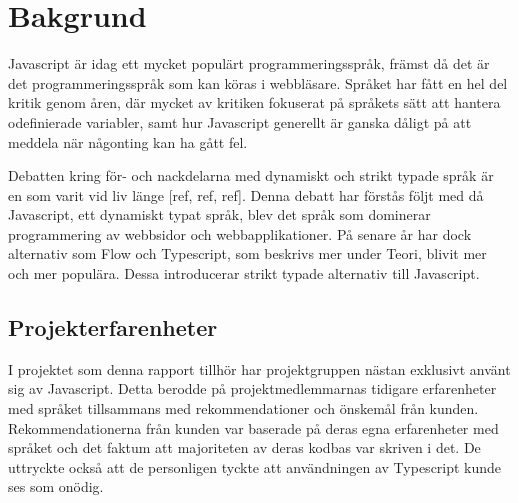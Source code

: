 \section{Bakgrund}
\label{sec:alexander-background}

Javascript är idag ett mycket populärt programmeringsspråk, främst då det är det programmeringsspråk som kan köras i webbläsare. Språket har fått en hel del kritik genom åren, där mycket av kritiken fokuserat på språkets sätt att hantera odefinierade variabler, samt hur Javascript generellt är ganska dåligt på att meddela när någonting kan ha gått fel.

Debatten kring för- och nackdelarna med dynamiskt och strikt typade språk är en som varit vid liv länge [ref, ref, ref]. Denna debatt har förstås följt med då Javascript, ett dynamiskt typat språk, blev det språk som dominerar programmering av webbsidor och webbapplikationer. På senare år har dock alternativ som Flow och Typescript, som beskrivs mer under Teori, blivit mer och mer populära. Dessa introducerar strikt typade alternativ till Javascript.

\subsection{Projekterfarenheter}
I projektet som denna rapport tillhör har projektgruppen nästan exklusivt använt sig av Javascript. Detta berodde på projektmedlemmarnas tidigare erfarenheter med språket tillsammans med rekommendationer och önskemål från kunden. Rekommendationerna från kunden var baserade på deras egna erfarenheter med språket och det faktum att majoriteten av deras kodbas var skriven i det. De uttryckte också att de personligen tyckte att användningen av Typescript kunde ses som onödig.